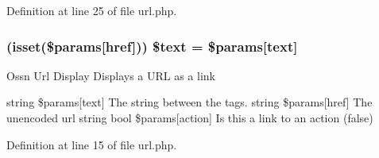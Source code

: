 Definition at line 25 of file url.\+php.

\subsubsection[{\texorpdfstring{\$text}{$text}}]{ (isset(\$params\mbox{[}\textquotesingle{}href\textquotesingle{}\mbox{]})) \$text = \$params\mbox{[}\textquotesingle{}text\textquotesingle{}\mbox{]}}\hypertarget{url_8php_abf91aba7b91b5ea106c98d5df48b292a}{}\label{url_8php_abf91aba7b91b5ea106c98d5df48b292a}
Ossn Url Display Displays a U\+RL as a link

string \$params\mbox{[}\textquotesingle{}text\textquotesingle{}\mbox{]} The string between the  tags.  string \$params\mbox{[}\textquotesingle{}href\textquotesingle{}\mbox{]} The unencoded url string  bool \$params\mbox{[}\textquotesingle{}action\textquotesingle{}\mbox{]} Is this a link to an action (false) 

Definition at line 15 of file url.\+php.


